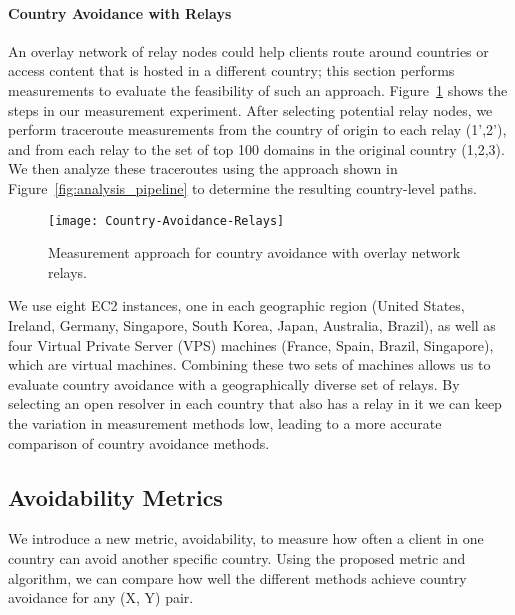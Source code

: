 \paragraph{Country Avoidance with Relays} 
An overlay network of relay nodes could
help clients route around countries or access content 
that is hosted in a different country; this section performs measurements to evaluate
the feasibility of such an approach. Figure~\ref{fig:avoidance_relays}
shows the steps in our measurement experiment.
After selecting potential relay nodes, we perform traceroute measurements from
the country of origin to each relay (1',2'), and from each relay to the set of top 100 domains
in the original country (1,2,3). We
then analyze these traceroutes using the approach shown in Figure~\ref{fig:analysis_pipeline}
to determine the resulting country-level paths. 

\begin{figure}[t]
\centering
\texttt{[image: Country-Avoidance-Relays]}
\caption{Measurement approach for country avoidance with overlay network relays.}
\label{fig:avoidance_relays}
\end{figure}

We use eight EC2 instances, one in each geographic region
(United States, Ireland, Germany, Singapore, South Korea, Japan, Australia,
Brazil), as well as four Virtual Private Server (VPS) machines (France,
Spain, Brazil, Singapore), which are virtual machines.
Combining these two sets of machines allows us to evaluate country avoidance with a geographically diverse set of relays. 
By selecting an open resolver in each country that also has a relay in it we can keep the variation in measurement methods low, leading to a more accurate comparison of country avoidance methods.

\subsection{Avoidability Metrics}
\label{metrics}

We introduce a new metric, avoidability, to measure how often a client in
one country can avoid another specific country.
Using the proposed metric
and algorithm, we can compare how well the different methods achieve
country avoidance for any (X, Y) pair.

